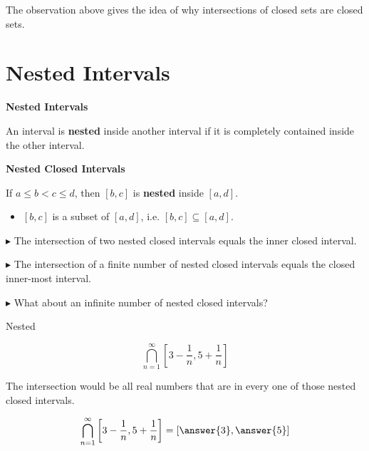 \documentclass{ximera}
\begin{document}
The observation above gives the idea of why intersections of closed sets are closed sets.
















\section*{Nested Intervals}



\begin{definition} \textbf{\textcolor{green!50!black}{Nested Intervals}}


An interval is \textbf{nested} inside another interval if it is completely contained inside the other interval.

\end{definition}




\textbf{Nested Closed Intervals}

If $a \leq b < c \leq d$, then $[b,c]$ is \textbf{\textcolor{purple!85!blue}{nested}} inside $[a,d]$.   

\begin{itemize}
\item $[b,c]$ is a subset of $[a,d]$, i.e. $[b,c] \subseteq [a,d]$.
\end{itemize}


$\blacktriangleright$  The intersection of two nested closed intervals equals the inner closed interval.

$\blacktriangleright$  The intersection of a finite number of nested closed intervals equals the closed inner-most interval.

$\blacktriangleright$ What about an infinite number of nested closed intervals?



\begin{example} Nested


\[ \bigcap_{n=1}^{\infty}   \left[3 - \frac{1}{n}, 5 + \frac{1}{n}\right]     \]



The intersection would be all real numbers that are in every one of those nested closed intervals.


\[ \bigcap_{n=1}^{\infty}   \left[3 - \frac{1}{n}, 5 + \frac{1}{n}\right]  = \left[\answer{3}, \answer{5}\right]   \]





\end{example} 
\end{document}
